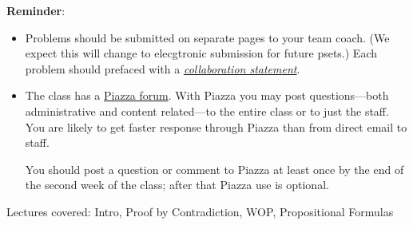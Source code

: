\documentclass[handout]{mcs}
\begin{document}
\renewcommand{\reading}{
\begin{itemize}
\item Chapter~\bref{proofs_chap}{.\ \emph{What is a Proof?}},

\item  Chapter~\bref{well_ordering_chap}{.\ \emph{The Well Ordering
      Principle}} through~\bref{factor_sec}{;}
  (omit~\bref{well_ordering_sec}{.\ \emph{Well Ordered Sets}}),

\item Chapter~\bref{logicform_chap}{.\ \emph{Logical Formulas}}
  through~\bref{equiv_valid_sec}.

\end{itemize}
These assigned readings do \textbf{not}
  include the Problem sections.  (Many of the problems in the text
  will appear as class or homework problems.)}


\medskip

\textbf{Reminder}:

\begin{itemize}

\item Problems should be submitted on separate pages to your team
  coach.  (We expect this will change to elecgtronic submission for
  future psets.)  Each problem should prefaced with a
  \href{http://courses.csail.mit.edu/6.042/spring16/pset_instructions.shtml#collab-state}
       {\emph{collaboration statement}}.

\item The class has a
  \href{http://piazza.com/mit/spring2016/6042j18062j/home} {Piazza
    forum}.  With Piazza you may post questions---both administrative
  and content related---to the entire class or to just the staff.  You
  are likely to get faster response through Piazza than from direct
  email to staff.

  You should post a question or comment to Piazza at least once by the
  end of the second week of the class; after that Piazza use is
  optional.
\end{itemize}

\begin{staffnotes}
Lectures covered: Intro, Proof by Contradiction, WOP, Propositional Formulas
\end{staffnotes}


\end{document}
